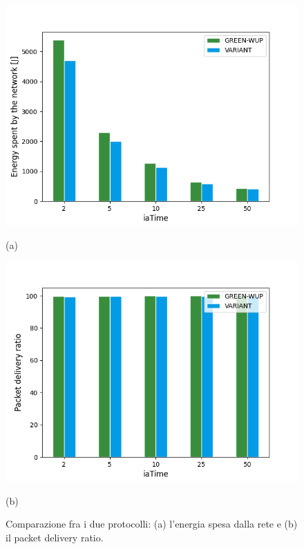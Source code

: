 \documentclass[binding=0.6cm,TFA]{sapthesis}
\begin{document}
\begin{figure}
    \centering
    \begin{minipage}{.5\textwidth}
        \centering
        \includegraphics[width=1\linewidth]{energy_plot.png}
        \caption*{(a)}
    \end{minipage}%
    \begin{minipage}{.5\textwidth}
        \centering
        \includegraphics[width=1\linewidth]{pdr_plot.png}
        \caption*{(b)}
    \end{minipage}
    \caption{Comparazione fra i due protocolli: (a) l'energia spesa dalla rete e (b) il packet delivery ratio.}
\end{figure}
\end{document}
